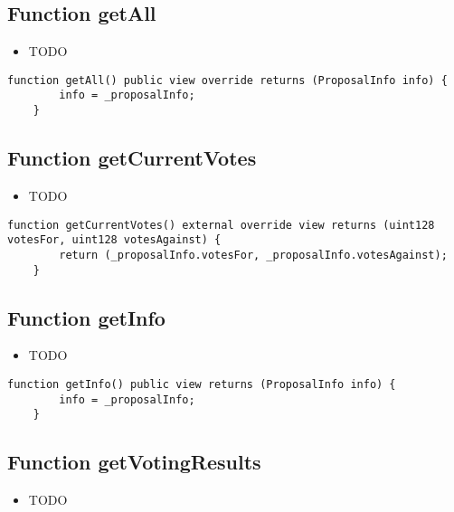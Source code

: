 \subsection{Function getAll}

\begin{itemize}
\item TODO
\end{itemize}

\begin{lstlisting}[firstnumber=199]
    function getAll() public view override returns (ProposalInfo info) {
        info = _proposalInfo;
    }
\end{lstlisting}

\subsection{Function getCurrentVotes}

\begin{itemize}
\item TODO
\end{itemize}

\begin{lstlisting}[firstnumber=212]
    function getCurrentVotes() external override view returns (uint128 votesFor, uint128 votesAgainst) {
        return (_proposalInfo.votesFor, _proposalInfo.votesAgainst);
    }
\end{lstlisting}

\subsection{Function getInfo}

\begin{itemize}
\item TODO
\end{itemize}

\begin{lstlisting}[firstnumber=208]
    function getInfo() public view returns (ProposalInfo info) {
        info = _proposalInfo;
    }
\end{lstlisting}

\subsection{Function getVotingResults}

\begin{itemize}
\item TODO
\end{itemize}

